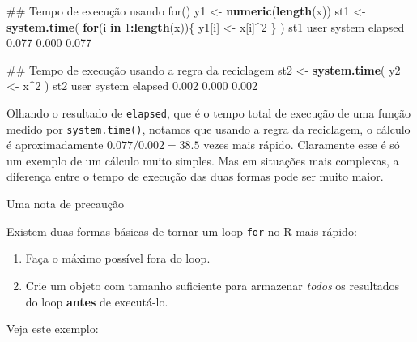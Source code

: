 \documentclass[10pt,a4paper]{book}
\newenvironment{Shaded}{\begin{snugshade}}{\end{snugshade}}
\newcommand{\KeywordTok}[1]{\textcolor[rgb]{0.13,0.29,0.53}{\textbf{#1}}}
\newcommand{\DecValTok}[1]{\textcolor[rgb]{0.00,0.00,0.81}{#1}}
\newcommand{\FloatTok}[1]{\textcolor[rgb]{0.00,0.00,0.81}{#1}}
\newcommand{\StringTok}[1]{\textcolor[rgb]{0.31,0.60,0.02}{#1}}
\newcommand{\ControlFlowTok}[1]{\textcolor[rgb]{0.13,0.29,0.53}{\textbf{#1}}}
\newcommand{\OperatorTok}[1]{\textcolor[rgb]{0.81,0.36,0.00}{\textbf{#1}}}
\newcommand{\NormalTok}[1]{#1}
\providecommand{\tightlist}{%
  \setlength{\itemsep}{0pt}\setlength{\parskip}{0pt}}
\begin{document}
\begin{Shaded}
\begin{Highlighting}[]
\NormalTok{## Tempo de execução usando for()}
\NormalTok{y1 <-}\StringTok{ }\KeywordTok{numeric}\NormalTok{(}\KeywordTok{length}\NormalTok{(x))}
\NormalTok{st1 <-}\StringTok{ }\KeywordTok{system.time}\NormalTok{(}
    \ControlFlowTok{for}\NormalTok{(i }\ControlFlowTok{in} \DecValTok{1}\OperatorTok{:}\KeywordTok{length}\NormalTok{(x))\{}
\NormalTok{        y1[i] <-}\StringTok{ }\NormalTok{x[i]}\OperatorTok{^}\DecValTok{2}
\NormalTok{    \}}
\NormalTok{)}
\NormalTok{st1}
\NormalTok{   user  system elapsed }
  \FloatTok{0.077}   \FloatTok{0.000}   \FloatTok{0.077} 

\NormalTok{## Tempo de execução usando a regra da reciclagem}
\NormalTok{st2 <-}\StringTok{ }\KeywordTok{system.time}\NormalTok{(}
\NormalTok{    y2 <-}\StringTok{ }\NormalTok{x}\OperatorTok{^}\DecValTok{2}
\NormalTok{)}
\NormalTok{st2}
\NormalTok{   user  system elapsed }
  \FloatTok{0.002}   \FloatTok{0.000}   \FloatTok{0.002} 
\end{Highlighting}
\end{Shaded}

Olhando o resultado de \texttt{elapsed}, que é o tempo total de execução
de uma função medido por \texttt{system.time()}, notamos que usando a
regra da reciclagem, o cálculo é aproximadamente \(0.077/0.002 = 38.5\)
vezes mais rápido. Claramente esse é só um exemplo de um cálculo muito
simples. Mas em situações mais complexas, a diferença entre o tempo de
execução das duas formas pode ser muito maior.

Uma nota de precaução

Existem duas formas básicas de tornar um loop \texttt{for} no R mais
rápido:

\begin{enumerate}
\def\labelenumi{\arabic{enumi}.}
\tightlist
\item
  Faça o máximo possível fora do loop.
\item
  Crie um objeto com tamanho suficiente para armazenar \emph{todos} os
  resultados do loop \textbf{antes} de executá-lo.
\end{enumerate}

Veja este exemplo:
\end{document}
